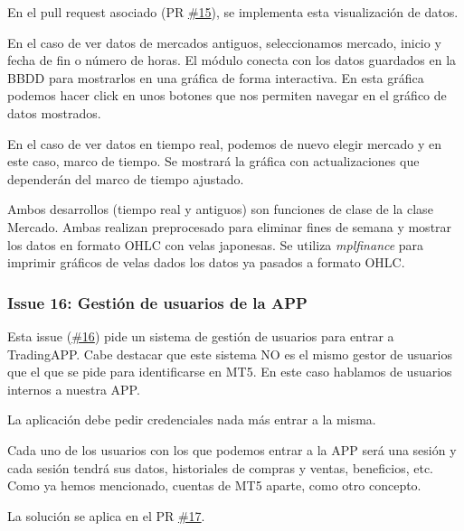 En el pull request asociado (PR \href{https://github.com/mcarmona99/TFG/pull/15}{\#15}), se implementa esta visualización de datos.\newline

En el caso de ver datos de mercados antiguos, seleccionamos mercado, inicio y fecha de fin o número de horas. El módulo conecta con los datos guardados en la BBDD para mostrarlos en una gráfica de forma interactiva. En esta gráfica podemos hacer click en unos botones que nos permiten navegar en el gráfico de datos mostrados.\newline

En el caso de ver datos en tiempo real, podemos de nuevo elegir mercado y en este caso, marco de tiempo. Se mostrará la gráfica con actualizaciones que dependerán del marco de tiempo ajustado. \newline

Ambos desarrollos (tiempo real y antiguos) son funciones de clase de la clase Mercado. Ambas realizan preprocesado para eliminar fines de semana y mostrar los datos en formato OHLC con velas japonesas. Se utiliza \textit{mplfinance} para imprimir gráficos de velas dados los datos ya pasados a formato OHLC.\newline

\subsubsection{Issue 16: Gestión de usuarios de la APP}

Esta issue (\href{https://github.com/mcarmona99/TFG/issues/16}{\#16}) pide un sistema de gestión de usuarios para entrar a TradingAPP. Cabe destacar que este sistema NO es el mismo gestor de usuarios que el que se pide para identificarse en MT5. En este caso hablamos de usuarios internos a nuestra APP.\newline

La aplicación debe pedir credenciales nada más entrar a la misma.\newline

Cada uno de los usuarios con los que podemos entrar a la APP será una sesión y cada sesión tendrá sus datos, historiales de compras y ventas, beneficios, etc. Como ya hemos mencionado, cuentas de MT5 aparte, como otro concepto.\newline

La solución se aplica en el PR \href{https://github.com/mcarmona99/TFG/pull/17}{\#17}.\newline

